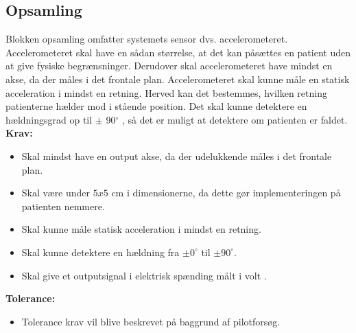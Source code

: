 \subsection{Opsamling}
Blokken opsamling omfatter systemets sensor dvs. accelerometeret. Accelerometeret skal have en sådan størrelse, at det kan påsættes en patient uden at give fysiske begrænsninger. Derudover skal accelerometeret have mindst en akse, da der måles i det frontale plan. %
Accelerometeret skal kunne måle en statisk acceleration i mindst en retning. Herved kan det bestemmes, hvilken retning patienterne hælder mod i stående position.  %
Det skal kunne detektere en hældningsgrad op til $\pm$ 90$^{\circ}$ , så det er muligt at detektere om patienten er faldet. \\
\textbf{Krav:}
\begin{itemize}
\item Skal mindst have en output akse, da der udelukkende måles i det frontale plan.
\item Skal være under $5x5$ cm i dimensionerne, da dette gør implementeringen på patienten nemmere.
\item Skal kunne måle statisk acceleration i mindst en retning.
\item Skal kunne detektere en hældning fra $\pm 0^{\circ}$ til $\pm 90^{\circ}$.
\item Skal give et outputsignal i elektrisk spænding målt i volt .
\end{itemize}
\textbf{Tolerance:}
\begin{itemize}
\item Tolerance krav vil blive beskrevet på baggrund af pilotforsøg.
\end{itemize}
